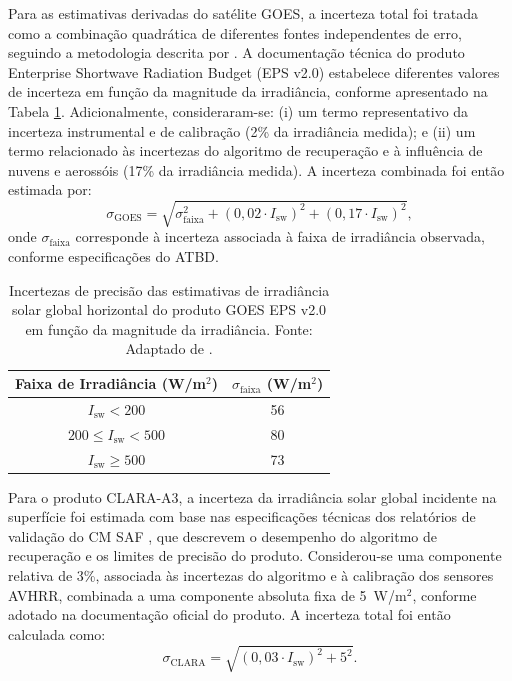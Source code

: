 \begin{itemize}
    Para as estimativas derivadas do satélite GOES, a incerteza total foi tratada como a 
    combinação quadrática de diferentes fontes independentes de erro, seguindo a metodologia 
    descrita por \cite{laszlo2020}. A documentação técnica do produto Enterprise Shortwave 
    Radiation Budget (EPS v2.0) estabelece diferentes valores de incerteza em função da 
    magnitude da irradiância, conforme apresentado na Tabela \ref{tab:incerteza_goes}. 
    Adicionalmente, consideraram-se: (i) um termo representativo da incerteza instrumental 
    e de calibração (2\% da irradiância medida); e (ii) um termo relacionado às incertezas 
    do algoritmo de recuperação e à influência de nuvens e aerossóis (17\% da irradiância 
    medida). A incerteza combinada foi então estimada por:
    \begin{equation}
    \sigma_{\text{GOES}} = \sqrt{\sigma^2_{\text{faixa}} + \left(0{,}02 \cdot I_{\text{sw}}\right)^2 + \left(0{,}17 \cdot I_{\text{sw}}\right)^2},
    \end{equation}
    \noindent onde $\sigma_{\text{faixa}}$ corresponde à incerteza associada à faixa de 
    irradiância observada, conforme especificações do ATBD.
    

    \begin{table}[H]
    \centering
    \caption[Incertezas de precisão das estimativas de irradiância solar global horizontal do produto GOES EPS v2.0 em função da magnitude da irradiância]{Incertezas de precisão das estimativas de irradiância solar global horizontal do produto GOES EPS v2.0 em função da magnitude da irradiância. Fonte: Adaptado de \cite{laszlo2020}.}
    \label{tab:incerteza_goes}
    \begin{tabular}{cc}
    \hline
    \textbf{Faixa de Irradiância (W/m$^2$)} & \textbf{$\sigma_{\text{faixa}}$ (W/m$^2$)} \\
    \hline
    $I_{\text{sw}} < 200$ & 56 \\
    $200 \leq I_{\text{sw}} < 500$ & 80 \\
    $I_{\text{sw}} \geq 500$ & 73 \\
    \hline
    \end{tabular}
    \end{table}

    Para o produto CLARA-A3, a incerteza da irradiância solar global incidente na superfície 
    foi estimada com base nas especificações técnicas dos relatórios de validação do CM SAF 
    \citep{karlsson2023claraA3}, que descrevem o desempenho do algoritmo de recuperação e 
    os limites de precisão do produto. Considerou-se uma componente relativa de 3\%, associada 
    às incertezas do algoritmo e à calibração dos sensores AVHRR, combinada a uma componente 
    absoluta fixa de 5~W/m$^2$, conforme adotado na documentação oficial do produto. A 
    incerteza total foi então calculada como:
    \begin{equation}
    \sigma_{\text{CLARA}} = \sqrt{\left(0{,}03 \cdot I_{\text{sw}}\right)^2 + 5^2}.
    \end{equation}

\end{itemize}
